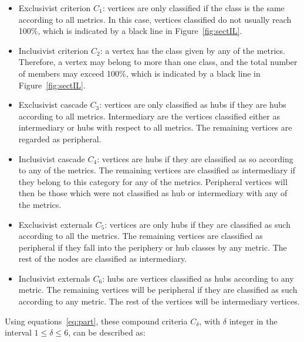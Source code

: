\documentclass[%
	aip,
	jmp,%
	amsmath,amssymb,
	reprint,%
]{revtex4-1}
\begin{document}
\begin{itemize}
	\item Exclusivist criterion $C_1$:  vertices are only classified if the class is the same according to all metrics. In this case, vertices classified do not usually reach 100\%, which is indicated by a black line in Figure~\ref{fig:sectIL}.
	\item Inclusivist criterion $C_2$: a vertex has the class given by any of the metrics. Therefore, a vertex may belong to more than one class, and the total number of members may exceed 100\%, which is indicated by a black line in Figure~\ref{fig:sectIL}.
	\item Exclusivist cascade $C_3$: vertices are only classified as hubs if they are hubs according to all metrics. Intermediary are the vertices classified either as intermediary or hubs with respect to all metrics. The remaining vertices are regarded as peripheral.
	\item Inclusivist cascade $C_4$: vertices are hubs if they are classified as so according to any of the metrics. The remaining vertices are classified as intermediary if they belong to this category for any of the metrics. Peripheral vertices will then be those which were not classified as hub or intermediary with any of the metrics. 
	\item Exclusivist externals $C_5$: vertices are only hubs if they are classified as such according to all the metrics. The remaining vertices are classified as peripheral if they fall into the periphery or hub classes by any metric. The rest of the nodes are classified as intermediary.
	\item Inclusivist externals $C_6$: hubs are vertices classified as hubs according to any metric. The remaining vertices will be peripheral if they are classified as such according to any metric. The rest of the vertices will be intermediary vertices.
\end{itemize}

Using equations~\ref{eq:part}, these compound criteria $C_\delta$, with $\delta$ integer in the interval $1\leq\delta\leq6$, can be described as:
\end{document}
